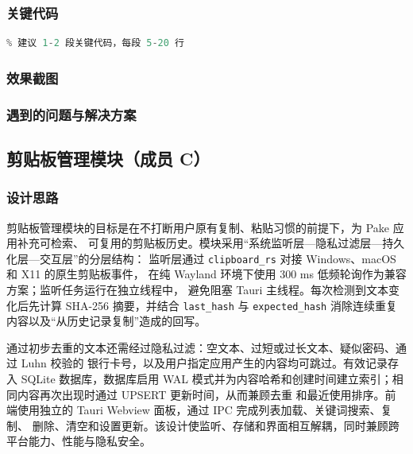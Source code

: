\documentclass[12pt,a4paper]{ctexart}
\begin{document}

\subsubsection{关键代码}

\begin{lstlisting}[language=Rust, caption=离线缓存示例代码]
% TODO: 成员 B 插入核心代码片段（HTTP 拦截器、LRU 淘汰、缓存索引维护等）
% 建议 1-2 段关键代码，每段 5-20 行
\end{lstlisting}

\subsubsection{效果截图}


\subsubsection{遇到的问题与解决方案}


\subsection{剪贴板管理模块（成员 C）}

\subsubsection{设计思路}

剪贴板管理模块的目标是在不打断用户原有复制、粘贴习惯的前提下，为 Pake 应用补充可检索、
可复用的剪贴板历史。模块采用“系统监听层—隐私过滤层—持久化层—交互层”的分层结构：
监听层通过 \texttt{clipboard\_rs} 对接 Windows、macOS 和 X11 的原生剪贴板事件，
在纯 Wayland 环境下使用 300 ms 低频轮询作为兼容方案；监听任务运行在独立线程中，
避免阻塞 Tauri 主线程。每次检测到文本变化后先计算 SHA-256 摘要，并结合
\texttt{last\_hash} 与 \texttt{expected\_hash} 消除连续重复内容以及“从历史记录复制”造成的回写。

通过初步去重的文本还需经过隐私过滤：空文本、过短或过长文本、疑似密码、通过 Luhn 校验的
银行卡号，以及用户指定应用产生的内容均可跳过。有效记录存入 SQLite 数据库，数据库启用 WAL
模式并为内容哈希和创建时间建立索引；相同内容再次出现时通过 UPSERT 更新时间，从而兼顾去重
和最近使用排序。前端使用独立的 Tauri Webview 面板，通过 IPC 完成列表加载、关键词搜索、复制、
删除、清空和设置更新。该设计使监听、存储和界面相互解耦，同时兼顾跨平台能力、性能与隐私安全。
\end{document}
